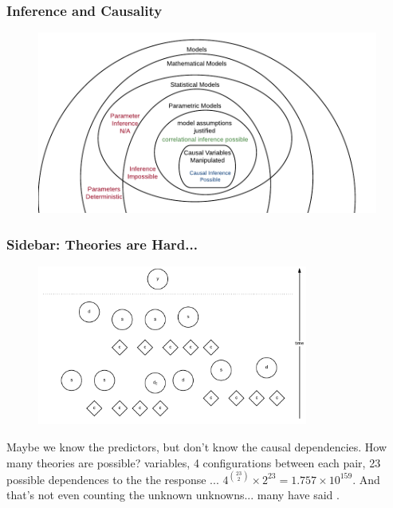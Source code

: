 \documentclass[handout]{beamer}
\begin{document}
\begin{frame}\frametitle{Inference and Causality}

\begin{figure}
\centering
\includegraphics[width=4.5in]{inference_possible}
\end{figure}

\end{frame}

\begin{frame}\frametitle{Sidebar: Theories are Hard...}
\begin{figure}
\centering
\includegraphics[width=3.5in]{theories_are_impossible}
\end{figure}

\footnotesize
Maybe we know the predictors, but don't know the causal dependencies. How many theories are possible?  variables, 4 configurations between each pair, 23 possible dependences to the the response ... $4^{\binom{23}{2}} \times 2^{23} = 1.757 \times 10^{159}$. And that's not even counting the unknown unknowns... many have said .

\end{frame}
\end{document}
